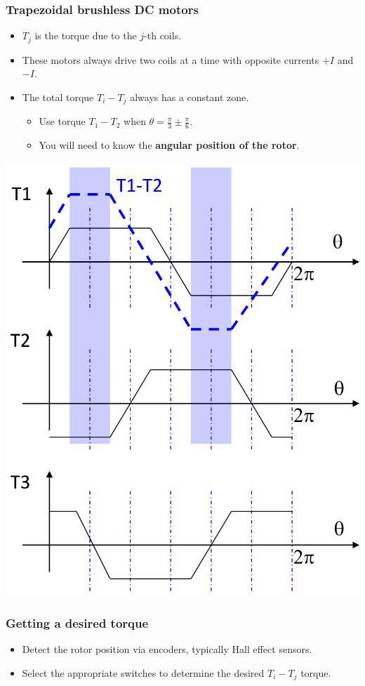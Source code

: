 \documentclass[11pt]{article}
\begin{document}
\subsubsection{Trapezoidal brushless DC motors}
\label{sec:org67a9e24}
\begin{itemize}
\item \(T_j\) is the torque due to the \(j\)-th coils.
\item These motors always drive two coils at a time with opposite currents \(+I\) and \(-I\).
\item The total torque \(T_i - T_j\) always has a constant zone.
\begin{itemize}
\item Use torque \(T_1 - T_2\) when \(\theta = \frac{\pi}{3} \pm \frac{\pi}{6}\).
\item You will need to know the \textbf{angular position of the rotor}.
\end{itemize}
\end{itemize}

\begin{center}
\includegraphics[width=.9\linewidth]{./images/trapezoidal-brushless-dc-motor-graphs.png}
\end{center}
\subsubsection{Getting a desired torque}
\label{sec:orgebbe0cc}
\begin{itemize}
\item Detect the rotor position via encoders, typically Hall effect sensors.
\item Select the appropriate switches to determine the desired \(T_i - T_j\) torque.
\end{itemize}
\end{document}
